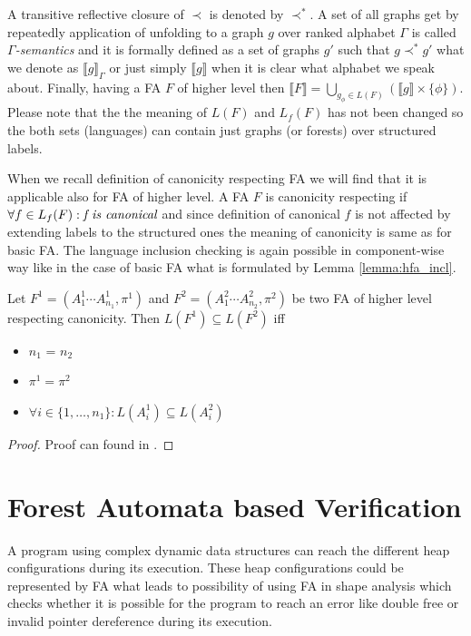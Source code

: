 A transitive reflective closure of $\prec$ is denoted by $\prec^*$.
A set of all graphs get by repeatedly application of unfolding to a graph $g$ over ranked alphabet $\Gamma$ is called
\emph{$\Gamma$-semantics} and it is formally defined as a set of graphs $g'$ such that $g \prec^* g'$
what we denote as $\llbracket g \rrbracket_\Gamma$ or just simply $\llbracket g \rrbracket$ when it is
clear what alphabet we speak about.
Finally, having a FA $F$ of higher level then $\llbracket F \rrbracket = \bigcup_{g_\phi \in L(F)} (\llbracket g \rrbracket \times \{\phi\})$.
Please note that the the meaning of $L(F)$ and $L_f(F)$ has not been changed so the both sets (languages) can contain just graphs (or forests)
over structured labels.

When we recall definition of canonicity respecting FA we will find that it is applicable also for FA of higher level.
A FA $F$ is canonicity respecting if $\forall f \in L_f(F): \emph{f is canonical}$ and since definition of canonical $f$
is not affected by extending labels to the structured ones the meaning of canonicity is same as for basic FA.
The language inclusion checking is again possible in component-wise way like in the case of basic FA what is
formulated by Lemma \ref{lemma:hfa_incl}.

\begin{lemma}
	Let $F^1 = (A_1^1\cdots A_{n_1}^1, \pi^1)$ and $F^2 = (A_1^2\cdots A_{n_2}^2, \pi^2)$
	be two FA of higher level respecting canonicity.
	Then $L(F^1) \subseteq L(F^2)$ iff
	\begin{itemize}
			\item $n_1$ = $n_2$
			\item $\pi^1 = \pi^2$
			\item $\forall i \in \{1,\ldots,n_1\}: L(A_i^1) \subseteq L(A_i^2)$
	\end{itemize}
	\label{lemma:hfa_incl}
\end{lemma}
\begin{proof}
	Proof can found in \cite{forester:techrep}.
\end{proof}


\chapter{Forest Automata based Verification}
\label{ch:fav}

A program using complex dynamic data structures can reach the different heap configurations
during its execution.
These heap configurations could be represented by FA what leads to possibility
of using FA in shape analysis which checks whether it is possible for the program to reach an error like double free or
invalid pointer dereference during its execution.

